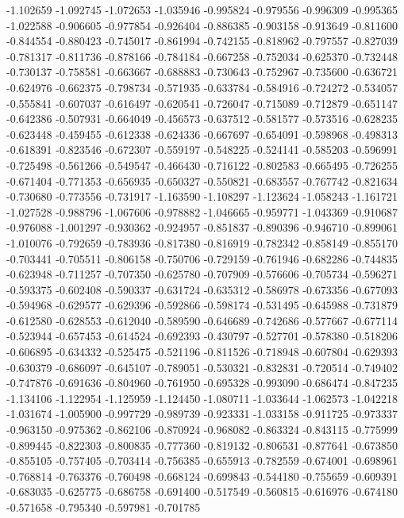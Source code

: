 -1.102659
-1.092745
-1.072653
-1.035946
-0.995824
-0.979556
-0.996309
-0.995365
-1.022588
-0.906605
-0.977854
-0.926404
-0.886385
-0.903158
-0.913649
-0.811600
-0.844554
-0.880423
-0.745017
-0.861994
-0.742155
-0.818962
-0.797557
-0.827039
-0.781317
-0.811736
-0.878166
-0.784184
-0.667258
-0.752034
-0.625370
-0.732448
-0.730137
-0.758581
-0.663667
-0.688883
-0.730643
-0.752967
-0.735600
-0.636721
-0.624976
-0.662375
-0.798734
-0.571935
-0.633784
-0.584916
-0.724272
-0.534057
-0.555841
-0.607037
-0.616497
-0.620541
-0.726047
-0.715089
-0.712879
-0.651147
-0.642386
-0.507931
-0.664049
-0.456573
-0.637512
-0.581577
-0.573516
-0.628235
-0.623448
-0.459455
-0.612338
-0.624336
-0.667697
-0.654091
-0.598968
-0.498313
-0.618391
-0.823546
-0.672307
-0.559197
-0.548225
-0.524141
-0.585203
-0.596991
-0.725498
-0.561266
-0.549547
-0.466430
-0.716122
-0.802583
-0.665495
-0.726255
-0.671404
-0.771353
-0.656935
-0.650327
-0.550821
-0.683557
-0.767742
-0.821634
-0.730680
-0.773556
-0.731917
-1.163590
-1.108297
-1.123624
-1.058243
-1.161721
-1.027528
-0.988796
-1.067606
-0.978882
-1.046665
-0.959771
-1.043369
-0.910687
-0.976088
-1.001297
-0.930362
-0.924957
-0.851837
-0.890396
-0.946710
-0.899061
-1.010076
-0.792659
-0.783936
-0.817380
-0.816919
-0.782342
-0.858149
-0.855170
-0.703441
-0.705511
-0.806158
-0.750706
-0.729159
-0.761946
-0.682286
-0.744835
-0.623948
-0.711257
-0.707350
-0.625780
-0.707909
-0.576606
-0.705734
-0.596271
-0.593375
-0.602408
-0.590337
-0.631724
-0.635312
-0.586978
-0.673356
-0.677093
-0.594968
-0.629577
-0.629396
-0.592866
-0.598174
-0.531495
-0.645988
-0.731879
-0.612580
-0.628553
-0.612040
-0.589590
-0.646689
-0.742686
-0.577667
-0.677114
-0.523944
-0.657453
-0.614524
-0.692393
-0.430797
-0.527701
-0.578380
-0.518206
-0.606895
-0.634332
-0.525475
-0.521196
-0.811526
-0.718948
-0.607804
-0.629393
-0.630379
-0.686097
-0.645107
-0.789051
-0.530321
-0.832831
-0.720514
-0.749402
-0.747876
-0.691636
-0.804960
-0.761950
-0.695328
-0.993090
-0.686474
-0.847235
-1.134106
-1.122954
-1.125959
-1.124450
-1.080711
-1.033644
-1.062573
-1.042218
-1.031674
-1.005900
-0.997729
-0.989739
-0.923331
-1.033158
-0.911725
-0.973337
-0.963150
-0.975362
-0.862106
-0.870924
-0.968082
-0.863324
-0.843115
-0.775999
-0.899445
-0.822303
-0.800835
-0.777360
-0.819132
-0.806531
-0.877641
-0.673850
-0.855105
-0.757405
-0.703414
-0.756385
-0.655913
-0.782559
-0.674001
-0.698961
-0.768814
-0.763376
-0.760498
-0.668124
-0.699843
-0.544180
-0.755659
-0.609391
-0.683035
-0.625775
-0.686758
-0.691400
-0.517549
-0.560815
-0.616976
-0.674180
-0.571658
-0.795340
-0.597981
-0.701785
